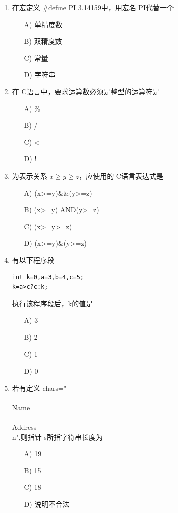 \documentclass[12pt,a4paper]{article}
\begin{document}
\begin{enumerate}
    \item 在宏定义 \#define PI 3.14159中，用宏名 PI代替一个
    \begin{enumerate}
        \item[A)] 单精度数
        \item[B)] 双精度数
        \item[C)] 常量
        \item[D)] 字符串
    \end{enumerate}
    
    \item 在 C语言中，要求运算数必须是整型的运算符是
    \begin{enumerate}
        \item[A)] \%
        \item[B)] /
        \item[C)] <
        \item[D)] !
    \end{enumerate}
    
    \item 为表示关系 $x \ge y \ge z$，应使用的 C语言表达式是
    \begin{enumerate}
        \item[A)] (x>=y)\&\&(y>=z)
        \item[B)] (x>=y) AND(y>=z)
        \item[C)] (x>=y>=z)
        \item[D)] (x>=y)\&(y>=z)
    \end{enumerate}
    
    \item 有以下程序段
    \begin{verbatim}
int k=0,a=3,b=4,c=5;
k=a>c?c:k;
    \end{verbatim}
    执行该程序段后，k的值是
    \begin{enumerate}
        \item[A)] 3
        \item[B)] 2
        \item[C)] 1
        \item[D)] 0
    \end{enumerate}
    
    \item 若有定义 char\*s="\\\\Name\\\\Address\\n",则指针 s所指字符串长度为
    \begin{enumerate}
        \item[A)] 19
        \item[B)] 15
        \item[C)] 18
        \item[D)] 说明不合法
    \end{enumerate}
    

\end{enumerate}
\end{document}
